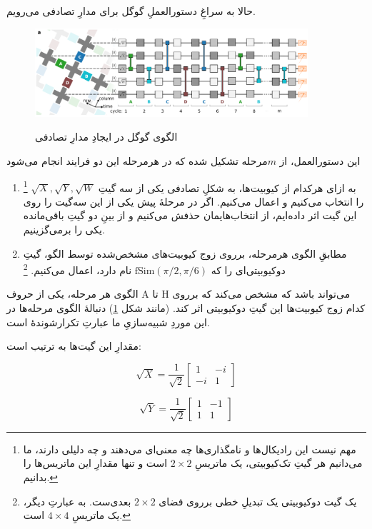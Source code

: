 \documentclass[11pt]{article}
\begin{document}
حالا به سراغِ دستورالعملِ گوگل برای مدارِ تصادفی می‌رویم.

\begin{figure}[H]
\centering
\includegraphics[width=0.9\textwidth]{res/google_circuit.png}
\label{fig:google_circuit}
\caption{الگوی گوگل در ایجادِ مدارِ تصادفی \cite{google}}
\end{figure}

این دستورالعمل، از $m$مرحله تشکیل شده که در هرمرحله این دو فرایند انجام می‌شود

\begin{enumerate}[-]
\item 
به ازای هرکدام از کیوبیت‌ها، به شکلِ تصادفی یکی از سه گیتِ $\sqrt{X}, \sqrt{Y}, \sqrt{W}$
\footnote{مهم نیست این رادیکال‌ها و نامگذاری‌ها چه معنی‌ای می‌دهند و چه دلیلی دارند، ما می‌دانیم هر گیتِ تک‌کیوبیتی، یک ماتریسِ 
$2\times 2$
 است و تنها مقدارِ این ماتریس‌ها را بدانیم.}
 را انتخاب می‌کنیم و اعمال می‌کنیم. اگر در مرحلهٔ پیش یکی از این سه‌گیت را روی این گیت اثر داده‌ایم، از انتخاب‌هایمان حذفش می‌کنیم و از بینِ دو گیتِ باقی‌مانده یکی را برمی‌گزینیم.

\item
مطابقِ الگوی هرمرحله، برروی زوج کیوبیت‌های مشخص‌شده توسط الگو، گیتِ دوکیوبیتی‌ای را که $\text{fSim}(\pi/2, \pi/6)$ نام دارد، اعمال می‌کنیم.
\footnote{یک گیت دوکیوبیتی یک تبدیلِ خطی برروی فضای 
$2 \times 2$
بعدی‌ست. به عبارتِ دیگر، یک ماتریسِ 
$4 \times 4$
 است.}
\end{enumerate}

الگوی هر مرحله، یکی از حروف A تا H می‌تواند باشد که مشخص می‌کند که برروی کدام زوج کیوبیت‌ها این گیتِ دوکیوبیتی اثر کند. (مانند شکل \ref{fig:google_circuit}) دنبالهٔ الگوی مرحله‌ها در این موردِ شبیه‌سازیِ ما عبارتِ تکرارشوندهٔ 
است.\cite{google}
 
 مقدارِ این گیت‌ها به ترتیب است:
 
\[ \sqrt{X} = \frac{1}{\sqrt{2}} \begin{bmatrix} 1 & - i \\ -i & 1 \end{bmatrix} \]
 
\[ \sqrt{Y} = \frac{1}{\sqrt{2}} \begin{bmatrix} 1 & - 1 \\ 1 & 1 \end{bmatrix} \]
\end{document}
